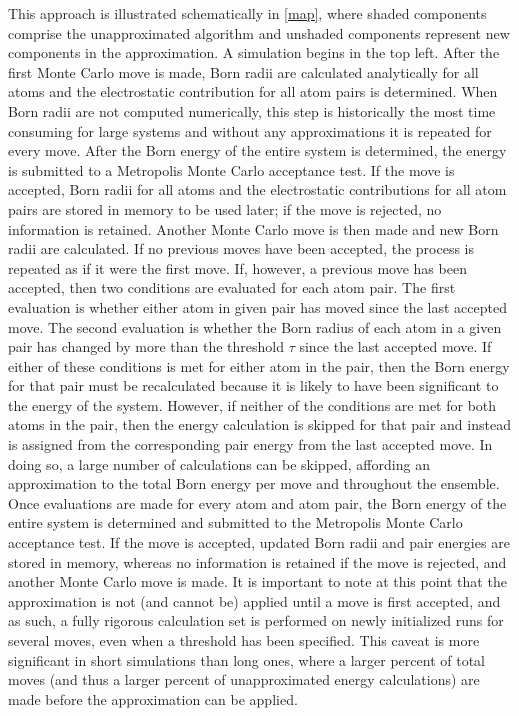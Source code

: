 \documentclass[12pt]{report}
\begin{document}
This approach is illustrated schematically in \cref{map}, where shaded components comprise the unapproximated algorithm and unshaded components represent new components in the approximation. A simulation begins in the top left. After the first Monte Carlo move is made, Born radii are calculated analytically for all atoms and the electrostatic contribution for all atom pairs is determined. When Born radii are not computed numerically, this step is historically the most time consuming for large systems and without any approximations it is repeated for every move. After the Born energy of the entire system is determined, the energy is submitted to a Metropolis Monte Carlo acceptance test. If the move is accepted, Born radii for all atoms and the electrostatic contributions for all atom pairs are stored in memory to be used later; if the move is rejected, no information is retained. Another Monte Carlo move is then made and new Born radii are calculated. If no previous moves have been accepted, the process is repeated as if it were the first move. If, however, a previous move has been accepted, then two conditions are evaluated for each atom pair. The first evaluation is whether either atom in given pair has moved since the last accepted move. The second evaluation is whether the Born radius of each atom in a given pair has changed by more than the threshold $\tau$ since the last accepted move. If either of these conditions is met for either atom in the pair, then the Born energy for that pair must be recalculated because it is likely to have been significant to the energy of the system. However, if neither of the conditions are met for both atoms in the pair, then the energy calculation is skipped for that pair and instead is assigned from the corresponding pair energy from the last accepted move. In doing so, a large number of calculations can be skipped, affording an approximation to the total Born energy per move and throughout the ensemble. Once evaluations are made for every atom and atom pair, the Born energy of the entire system is determined and submitted to the Metropolis Monte Carlo acceptance test. If the move is accepted, updated Born radii and pair energies are stored in memory, whereas no information is retained if the move is rejected, and another Monte Carlo move is made. It is important to note at this point that the approximation is not (and cannot be) applied until a move is first accepted, and as such, a fully rigorous calculation set is performed on newly initialized runs for several moves, even when a threshold has been specified. This caveat is more significant in short simulations than long ones, where a larger percent of total moves (and thus a larger percent of unapproximated energy calculations) are made before the approximation can be applied.
\end{document}

